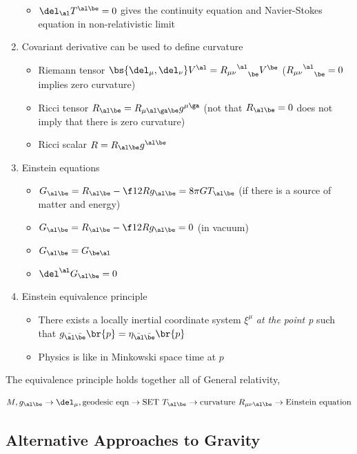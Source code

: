 \documentclass{article}
\begin{document}
\begin{enumerate}
\begin{itemize}
        \item $\del_\al T^{\al\be} = 0$ gives the continuity equation and Navier-Stokes equation in non-relativistic limit
    \end{itemize}
    \item Covariant derivative can be used to define curvature
    \begin{itemize}
        \item Riemann tensor $\bs{\del_\mu, \del_\nu}V^\al = {{R_{\mu\nu}}^\al}_\be V^\be$ (${{R_{\mu\nu}}^\al}_\be=0$ implies zero curvature)
        \item Ricci tensor $R_{\al\be} = R_{\mu\al\ga\be} g^{\mu\ga}$ (not that $R_{\al\be}=0$ does not imply that there is zero curvature)
        \item Ricci scalar $R = R_{\al\be}g^{\al\be}$
    \end{itemize}
    \item Einstein equations
    \begin{itemize}
        \item $G_{\al\be} = R_{\al\be} - \f12 R g_{\al\be} = 8 \pi G T_{\al\be}$ (if there is a source of matter and energy)
        \item $G_{\al\be} = R_{\al\be} - \f12 R g_{\al\be} = 0$ (in vacuum)
        \item $G_{\al\be} = G_{\be\al}$
        \item $\del^\al G_{\al\be} = 0$
    \end{itemize}
    \item Einstein equivalence principle
    \begin{itemize}
        \item There exists a locally inertial coordinate system $\xi^\mu$ \textit{at the point p} such that $g_{\bar{\al}\bar{\be}}\br{p} = \eta_{\bar{\al}\bar{\be}}\br{p}$
        \item Physics is like in Minkowski space time at $p$
    \end{itemize}

\end{enumerate}

The equivalence principle holds together all of General relativity,

\[ M, g_{\al\be} \to \del_\mu, \text{geodesic eqn} \to \text{SET } T_{\al\be} \to \text{curvature } R_{\mu\nu\al\be} \to \text{Einstein equation} \]

\subsection{Alternative Approaches to Gravity}
\end{document}
